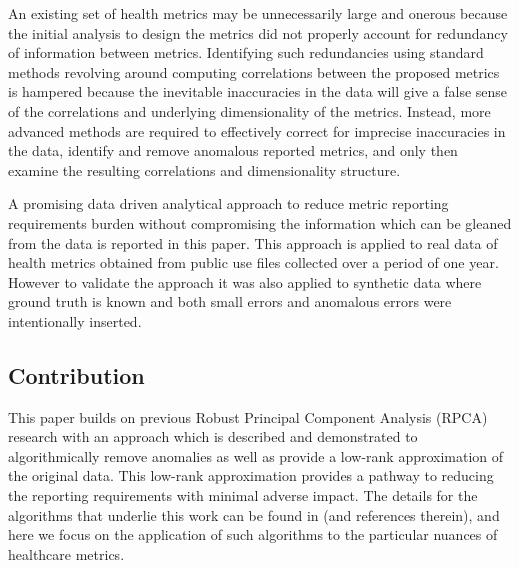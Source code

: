 \documentclass[conference]{IEEEtran}
\begin{document}
An existing set of health metrics may be unnecessarily large and onerous because the initial analysis to design the metrics did not properly account for redundancy of information between metrics.
Identifying such redundancies using standard methods revolving around computing correlations between the proposed metrics is hampered because the inevitable inaccuracies in the data will give a false sense of the correlations and underlying dimensionality of the metrics.   Instead, more advanced methods are required to effectively correct for imprecise inaccuracies in the data, identify and remove anomalous reported metrics, and only then examine the resulting correlations and dimensionality structure.

A promising data driven analytical approach to reduce metric reporting requirements burden without compromising the information which can be gleaned from the data is reported in this paper. This approach is applied to real data of  health metrics obtained from public use files collected over a period of one year.  However to validate the approach it was also applied to synthetic data where ground truth is known and both small errors and anomalous errors were intentionally inserted.


\subsection{Contribution}
This paper builds on previous Robust Principal Component Analysis (RPCA) research with an approach which is described and demonstrated to algorithmically remove anomalies as well as provide a low-rank approximation of the original data.  This low-rank approximation provides a pathway to reducing the reporting requirements with minimal adverse impact.  The details for the algorithms that underlie this work can be found in \cite{paffenroth2018robust,Paffenroth2012} (and references therein), and here we focus on the application of such algorithms to the particular nuances of healthcare metrics. 
\end{document}

